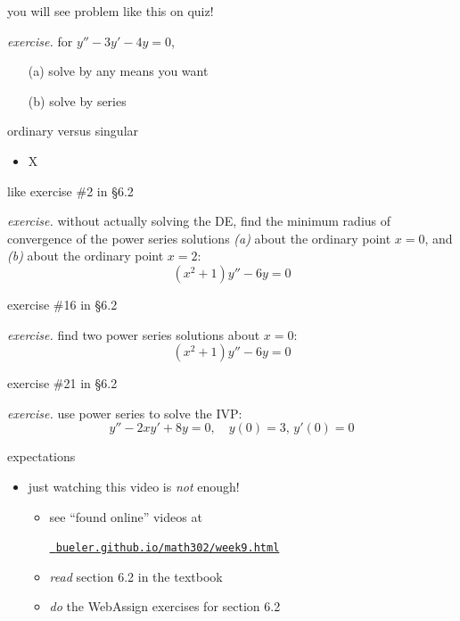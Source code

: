 \documentclass[urlcolor=blue,dvipsnames]{beamer}
\begin{document}
\begin{frame}{you will see problem like this on quiz!}

\noindent \emph{exercise.}  for $y''-3y'-4y=0$,

\begin{itemize}
\item[(a)] solve by any means you want
\item[(b)] solve by series
\end{itemize}

\vspace{50mm}
\end{frame}


\begin{frame}{ordinary versus singular}

\begin{itemize}
\item X
\end{itemize}
\end{frame}


\begin{frame}{like exercise \#2 in \S 6.2}

\noindent \emph{exercise.}  without actually solving the DE, find the minimum radius of convergence of the power series solutions \emph{(a)} about the ordinary point $x=0$, and \emph{(b)} about the ordinary point $x=2$:
    $$(x^2+1) y'' - 6 y = 0$$

\vspace{50mm}
\end{frame}


\begin{frame}{exercise \#16 in \S 6.2}

\noindent \emph{exercise.}  find two power series solutions about $x=0$:
    $$(x^2+1) y'' - 6 y = 0$$

\vspace{50mm}
\end{frame}


\begin{frame}{exercise \#21 in \S 6.2}

\noindent \emph{exercise.}  use power series to solve the IVP:
    $$y'' - 2 x y' + 8 y = 0, \quad y(0)=3, \, y'(0)=0$$

\vspace{50mm}
\end{frame}


\begin{frame}{expectations}

\begin{itemize}
\item just watching this video is \emph{not} enough!
     \begin{itemize}
     \item see ``found online'' videos at

     \centerline{\href{https://bueler.github.io/math302/week9.html}{\tt \color{cyan} bueler.github.io/math302/week9.html}}
     \item \emph{read} section 6.2 in the textbook
     \item \emph{do} the WebAssign exercises for section 6.2
     \end{itemize}
\end{itemize}
\end{frame}
\end{document}

